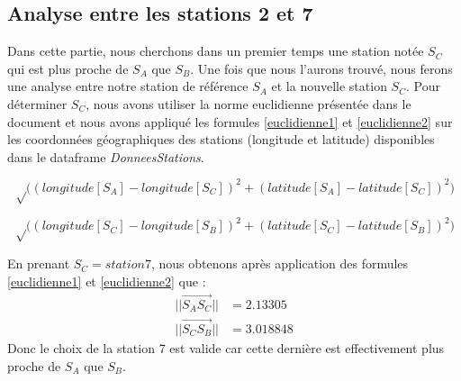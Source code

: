 \documentclass[a4paper,french,10pt]{article}
\begin{document}
\subsection{Analyse entre les stations 2 et 7}
Dans cette partie, nous cherchons dans un premier temps une station notée $S_C$ qui est plus proche de $S_A$ que $S_B$. Une fois que nous l'aurons trouvé, nous ferons une analyse entre notre station de référence $S_A$ et la nouvelle station $S_C$.
Pour déterminer $S_C$, nous avons utiliser la norme euclidienne présentée dans le document \cite{norme_euclid} et nous avons appliqué les formules \ref{euclidienne1} et \ref{euclidienne2} sur les coordonnées géographiques des stations (longitude et latitude) disponibles dans le dataframe \textit{DonneesStations}.

\begin{equation}
	\label{euclidienne1}
	\sqrt \Big(  (longitude[S_A] - longitude[S_C])^2 + (latitude[S_A] - latitude[S_C])^2 \Big)
\end{equation}

\begin{equation}
	\label{euclidienne2}
	\sqrt \Big(  (longitude[S_C] - longitude[S_B])^2 + (latitude[S_C] - latitude[S_B])^2 \Big)
\end{equation}

En prenant $S_C = station7$, nous obtenons après application des formules \ref{euclidienne1} et \ref{euclidienne2} que :
\begin{align*}
	|| \overrightarrow{S_A S_C} || &=  2.13305 \\
	|| \overrightarrow{S_C S_B} || &=  3.018848
\end{align*}
Donc le choix de la station 7 est valide car cette dernière est effectivement plus proche de $S_A$ que $S_B$.

\vspace{3mm}
\end{document}
